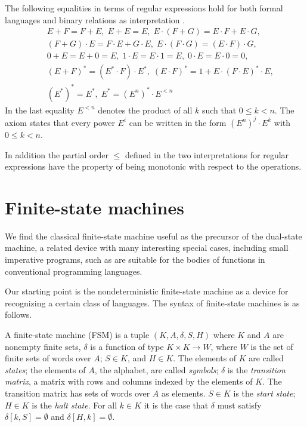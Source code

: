 \documentclass[preprint,11pt]{elsarticle}
\begin{document}
The following equalities in terms of regular expressions
hold for both formal languages and
binary relations as interpretation \cite{cnw71}.
\begin{eqnarray*}
&& E+F = F+E,\; E+E = E,\;
   E\cdot(F+G) = E\cdot F + E\cdot G,\; \\
&& (F+G)\cdot E = F\cdot E + G\cdot E,\; 
   E\cdot(F\cdot G) = (E\cdot F)\cdot G,\;\\
&& 0+E = E+0 = E,\;
   1\cdot E = E \cdot 1 = E,\;
   0\cdot E = E \cdot 0 = 0,\\
&& (E+F)^* = (E^*\cdot F)\cdot E^*,\;
   (E\cdot F)^* = 1+E\cdot(F\cdot E)^*\cdot E,\;\\
&& (E^*)^* = E^*,\;
   E^* = (E^n)^*\cdot E^{<n}
\end{eqnarray*}
In the last equality $E^{<n}$ denotes the product of
all $k$ such that $0 \leq k < n$.
The axiom states that every power $E^i$ can be written
in the form $(E^n)^j \cdot E^k$ with $0 \leq k < n$.

In addition the partial order $\leq$
defined in the two interpretations for regular expressions
have the property of being
monotonic with respect to the operations.

\section{Finite-state machines}
\label{sec:FSM}

We find the classical finite-state machine useful
as the precursor of the dual-state machine,
a related device with many interesting special cases,
including small imperative programs,
such as are suitable for the bodies of functions in
conventional programming languages.

Our starting point is the nondeterministic
finite-state machine as
a device for recognizing a certain class of languages.
The syntax of finite-state machines is as follows.

\begin{definition}
\label{def:FSMsynt}
A finite-state machine (FSM)
is a tuple $(K,A,\delta,S,H)$
where $K$ and $A$ are nonempty finite sets,
$\delta$ is a function of type
$K \times K \to W$, where $W$ is the set of finite sets of
words over $A$;
$S \in K$, and
$H \in K$.
The elements of $K$ are called \emph{states};
the elements of $A$, the alphabet, are called \emph{symbols};
$\delta$ is the \emph{transition matrix},
a matrix with rows and columns indexed by the elements of $K$.
The transition matrix has sets of words over $A$ as elements.
$S \in K$ is the \emph{start state};
$H \in K$ is the \emph{halt state}.
For all $k \in K$ it is the case that $\delta$
must satisfy $\delta[k,S] = \emptyset$
and $\delta[H,k] = \emptyset$.
\end{definition}
\end{document}
